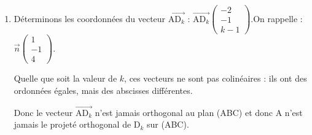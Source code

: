 \documentclass[10pt]{article}
\providecommand{\vect}[1]{\overrightarrow{#1}}
\begin{document}
\begin{enumerate}
\begin{enumerate}
 		Seul le point $\mathrm{D}_{\frac54}$ est sur le plan (ABC).

 		Son projeté orthogonal sur (ABC) est alors lui-même, par  définition du projeté orthogonal.

		\item Déterminons les coordonnées du vecteur $\vect{\mathrm{AD}_k}$ : \quad $\vect{\mathrm{AD}_k} \begin{pmatrix} -2\\-1\\k-1 \end{pmatrix} $.\quad On rappelle : \quad $\vect{n} \begin{pmatrix} 1\\-1\\4 \end{pmatrix}$.

		Quelle que soit la valeur de $k$, ces vecteurs ne sont pas colinéaires : ils ont des ordonnées égales, mais des abscisses différentes.

		Donc le vecteur $\vect{\mathrm{AD}_k}$ n'est jamais orthogonal au plan (ABC) et donc A n'est jamais le projeté orthogonal de $\mathrm{D}_k$ sur (ABC).
	\end{enumerate}
\end{enumerate}
\end{document}
